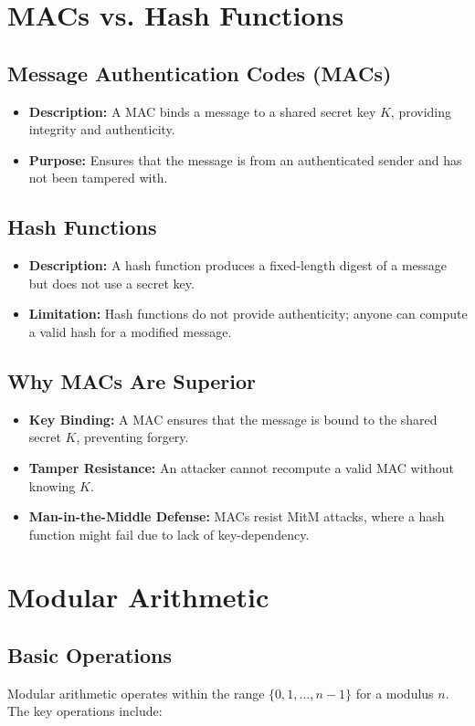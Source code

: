 \documentclass[12pt]{article}
\begin{document}
\section*{MACs vs. Hash Functions}
\subsection*{Message Authentication Codes (MACs)}
\begin{itemize}
    \item \textbf{Description:} A MAC binds a message to a shared secret key \( K \), providing integrity and authenticity.
    \item \textbf{Purpose:} Ensures that the message is from an authenticated sender and has not been tampered with.
\end{itemize}

\subsection*{Hash Functions}
\begin{itemize}
    \item \textbf{Description:} A hash function produces a fixed-length digest of a message but does not use a secret key.
    \item \textbf{Limitation:} Hash functions do not provide authenticity; anyone can compute a valid hash for a modified message.
\end{itemize}

\subsection*{Why MACs Are Superior}
\begin{itemize}
    \item \textbf{Key Binding:} A MAC ensures that the message is bound to the shared secret \( K \), preventing forgery.
    \item \textbf{Tamper Resistance:} An attacker cannot recompute a valid MAC without knowing \( K \).
    \item \textbf{Man-in-the-Middle Defense:} MACs resist MitM attacks, where a hash function might fail due to lack of key-dependency.
\end{itemize}

\section*{Modular Arithmetic}
\subsection*{Basic Operations}
Modular arithmetic operates within the range \( \{0, 1, \dots, n-1\} \) for a modulus \( n \). The key operations include:
\end{document}
